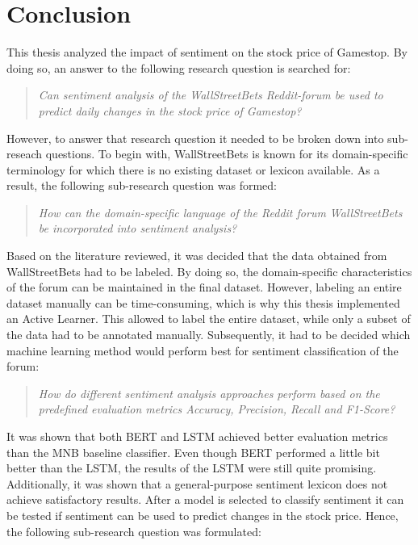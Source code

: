 \documentclass[11pt, a4paper]{article}
\begin{document}
\section{Conclusion}
This thesis analyzed the impact of sentiment on the stock price of Gamestop. By doing so, an answer to the following
research question is searched for:

\begin{quote}
    \emph{Can sentiment analysis of the WallStreetBets Reddit-forum be used to predict daily changes in the stock price of Gamestop?}
\end{quote}

However, to answer that research question it needed to be broken down into sub-reseach questions. To begin with, WallStreetBets
is known for its domain-specific terminology for which there is no existing dataset or lexicon available. As a result, the following
sub-research question was formed:

\begin{quote}
    \emph{How can the domain-specific language of the Reddit forum WallStreetBets be incorporated into sentiment analysis?}
\end{quote}

Based on the literature reviewed, it was decided that the data obtained from WallStreetBets had to be labeled. By doing so,
the domain-specific characteristics of the forum can be maintained in the final dataset.
However, labeling an entire dataset manually can be
time-consuming, which is why this thesis implemented an Active Learner. This allowed to label the entire dataset, while only
a subset of the data had to be annotated manually.
Subsequently, it had to be decided which machine learning method would perform best for sentiment classification of the forum:

\begin{quote}
    \emph{How do different sentiment analysis approaches perform based on the predefined evaluation metrics Accuracy, Precision, Recall and F1-Score?}
\end{quote}

It was shown that both BERT and LSTM achieved better evaluation metrics than the MNB baseline classifier. Even though
BERT performed a little bit better than the LSTM, the results of the LSTM were still quite promising. Additionally, it was shown
that a general-purpose sentiment lexicon does not achieve satisfactory results. After a model is selected to classify sentiment
it can be tested if sentiment can be used to predict changes in the stock price. Hence, the following sub-research question was formulated:
\end{document}
